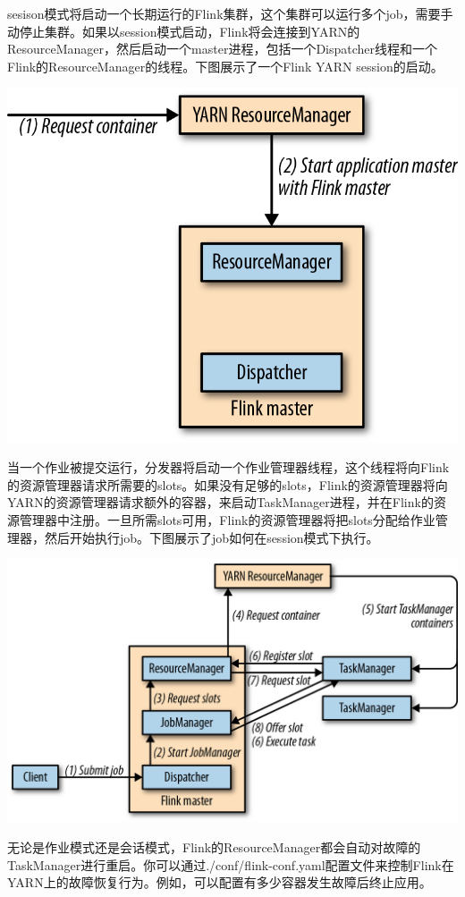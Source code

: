 \documentclass[cn,11pt,chinese]{elegantbook}
\begin{document}
sesison模式将启动一个长期运行的Flink集群，这个集群可以运行多个job，需要手动停止集群。如果以session模式启动，Flink将会连接到YARN的ResourceManager，然后启动一个master进程，包括一个Dispatcher线程和一个Flink的ResourceManager的线程。下图展示了一个Flink
YARN session的启动。

\includegraphics{images/spaf_0904.png}

当一个作业被提交运行，分发器将启动一个作业管理器线程，这个线程将向Flink的资源管理器请求所需要的slots。如果没有足够的slots，Flink的资源管理器将向YARN的资源管理器请求额外的容器，来启动TaskManager进程，并在Flink的资源管理器中注册。一旦所需slots可用，Flink的资源管理器将把slots分配给作业管理器，然后开始执行job。下图展示了job如何在session模式下执行。

\includegraphics{images/spaf_0905.png}

无论是作业模式还是会话模式，Flink的ResourceManager都会自动对故障的TaskManager进行重启。你可以通过./conf/flink-conf.yaml配置文件来控制Flink在YARN上的故障恢复行为。例如，可以配置有多少容器发生故障后终止应用。
\end{document}
